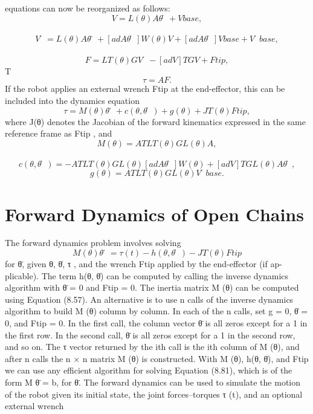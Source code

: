 \documentclass[12pt,a4paper]{article}
\begin{document}
equations can now be reorganized as follows:
                                 
\begin{equation}
V = L(θ) Aθ̇ + Vbase ,
\label{eq:8.73}
\end{equation}
                                                                
\begin{equation}
V̇ = L(θ) Aθ̈ + [adAθ̇ ]W(θ)V + [adAθ̇ ]Vbase + V̇base ,
\label{eq:8.74}
\end{equation}
                                            
\begin{equation}
F = LT (θ) G V̇ − [adV ]T GV + Ftip ,
\label{eq:8.75}
\end{equation}
                           T
\begin{equation}
τ    = A F.
\label{eq:8.76}
\end{equation}
If the robot applies an external wrench Ftip at the end-effector, this can be
included into the dynamics equation
\begin{equation}
τ = M (θ)θ̈ + c(θ, θ̇) + g(θ) + J T (θ)Ftip ,
\label{eq:8.77}
\end{equation}
where J(θ) denotes the Jacobian of the forward kinematics expressed in the
same reference frame as Ftip , and
\begin{equation}
M (θ) = AT LT (θ)GL(θ)A,
\label{eq:8.78}
\end{equation}
                                                              
\begin{equation}
c(θ, θ̇) = −AT LT (θ) GL(θ) [adAθ̇ ]W(θ) + [adV ]T G L(θ)Aθ̇,
\label{eq:8.79}
\end{equation}
\begin{equation}
g(θ)     = AT LT (θ)GL(θ)V̇base .
\label{eq:8.80}
\end{equation}
\section{Forward Dynamics of Open Chains}
The forward dynamics problem involves solving
\begin{equation}
M (θ)θ̈ = τ (t) − h(θ, θ̇) − J T (θ)Ftip
\label{eq:8.81}
\end{equation}
for θ̈, given θ, θ̇, τ , and the wrench Ftip applied by the end-effector (if ap-
plicable). The term h(θ, θ̇) can be computed by calling the inverse dynamics
algorithm with θ̈ = 0 and Ftip = 0. The inertia matrix M (θ) can be computed
using Equation (8.57). An alternative is to use n calls of the inverse dynamics
algorithm to build M (θ) column by column. In each of the n calls, set g = 0,
θ̇ = 0, and Ftip = 0. In the first call, the column vector θ̈ is all zeros except
for a 1 in the first row. In the second call, θ̈ is all zeros except for a 1 in the
second row, and so on. The τ vector returned by the ith call is the ith column
of M (θ), and after n calls the n × n matrix M (θ) is constructed.
    With M (θ), h(θ, θ̇), and Ftip we can use any efficient algorithm for solving
Equation (8.81), which is of the form M θ̈ = b, for θ̈.
    The forward dynamics can be used to simulate the motion of the robot given
its initial state, the joint forces–torques τ (t), and an optional external wrench
\end{document}
